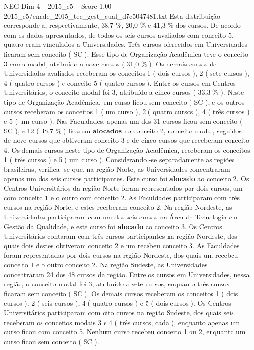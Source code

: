 \begin{textsample}{NEG Dim 4 – 2015\_c5 – Score 1.00 – 2015\_c5/enade\_2015\_tec\_gest\_qual\_d7c5047481.txt}
Esta distribuição corresponde a, respectivamente, 38,7 \%, 20,0 \% e 41,3 \% dos cursos.
De acordo com os dados apresentados, de todos os seis cursos avaliados com conceito 5, quatro eram vinculados a Universidades.
Três cursos oferecidos em Universidades ficaram sem conceito ( SC ).
Esse tipo de Organização Acadêmica teve o conceito 3 como modal, atribuído a nove cursos ( 31,0 \% ).
Os demais cursos de Universidades avaliados receberam os conceitos 1 ( dois cursos ), 2 ( sete cursos ), 4 ( quatro cursos ) e conceito 5 ( quatro cursos ).
Entre os cursos em Centros Universitários, o conceito modal foi 3, atribuído a cinco cursos ( 33,3 \% ).
Neste tipo de Organização Acadêmica, um curso ficou sem conceito ( SC ), e os outros cursos receberam os conceitos 1 ( um curso ), 2 ( quatro cursos ), 4 ( três cursos ) e 5 ( um curso ).
Nas Faculdades, apenas um dos 31 cursos ficou sem conceito ( SC ), e 12 ( 38,7 \% ) ficaram \textbf{alocados} no conceito 2, conceito modal, seguidos de nove cursos que obtiveram conceito 3 e de cinco cursos que receberam conceito 4.
Os demais cursos neste tipo de Organização Acadêmica, receberam os conceitos 1 ( três cursos ) e 5 ( um curso ).
Considerando -se separadamente as regiões brasileiras, verifica -se que, na região Norte, as Universidades concentraram apenas um dos seis cursos participantes.
Este curso foi \textbf{alocado} ao conceito 2.
Os Centros Universitários da região Norte foram representados por dois cursos, um com conceito 1 e o outro com conceito 2.
As Faculdades participaram com três cursos na região Norte, e estes receberam conceito 2.
Na região Nordeste, as Universidades participaram com um dos seis cursos na Área de Tecnologia em Gestão da Qualidade, e este curso foi \textbf{alocado} ao conceito 3.
Os Centros Universitários contaram com três cursos participantes na região Nordeste, dos quais dois destes obtiveram conceito 2 e um recebeu conceito 3.
As Faculdades foram representadas por dois cursos na região Nordeste, dos quais um recebeu conceito 1 e o outro conceito 2.
Na região Sudeste, as Universidades concentraram 24 dos 48 cursos da região.
Entre os cursos em Universidades, nessa região, o conceito modal foi 3, atribuído a sete cursos, enquanto três cursos ficaram sem conceito ( SC ).
Os demais cursos receberam os conceitos 1 ( dois cursos ), 2 ( seis cursos ), 4 ( quatro cursos ) e 5 ( dois cursos ).
Os Centros Universitários participaram com oito cursos na região Sudeste, dos quais seis receberam os conceitos modais 3 e 4 ( três cursos, cada ), enquanto apenas um curso ficou com conceito 5.
Nenhum curso recebeu conceito 1 ou 2, enquanto um curso ficou sem conceito ( SC ).

\end{textsample}
